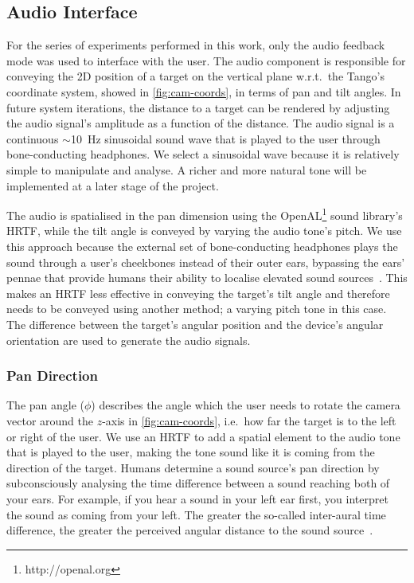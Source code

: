 \documentclass[sigconf, review=true, screen=true, anonymous=true]{acmart}
\begin{document}
\subsection{Audio Interface}

For the series of experiments performed in this work, only the audio feedback mode was used to interface with the user.
The audio component is responsible for conveying the 2D position of a target on the vertical plane w.r.t.\ the Tango's coordinate system, showed in \cref{fig:cam-coords}, in terms of pan and tilt angles.
In future system iterations, the distance to a target can be rendered by adjusting the audio signal's amplitude as a function of the distance.
The audio signal is a continuous $\sim$\SI{10}{\hertz} sinusoidal sound wave that is played to the user through bone-conducting headphones.
We select a sinusoidal wave because it is relatively simple to manipulate and analyse.
A richer and more natural tone will be implemented at a later stage of the project. 

The audio is spatialised in the pan dimension using the OpenAL\footnote{http://openal.org} sound library's HRTF, while the tilt angle is conveyed by varying the audio tone's pitch.
We use this approach because the external set of bone-conducting headphones plays the sound through a user's cheekbones instead of their outer ears, bypassing the ears' pennae that provide humans their ability to localise elevated sound sources~\cite{roffler1968factors, algazi2001elevation}.
This makes an HRTF less effective in conveying the target's tilt angle and therefore needs to be conveyed using another method; a varying pitch tone in this case.
The difference between the target's angular position and the device's angular orientation are used to generate the audio signals. 

\subsubsection{Pan Direction}

The pan angle ($\phi$) describes the angle which the user needs to rotate the camera vector around the $z$-axis in \cref{fig:cam-coords}, i.e.\ how far the target is to the left or right of the user.
We use an HRTF to add a spatial element to the audio tone that is played to the user, making the tone sound like it is coming from the direction of the target.
Humans determine a sound source's pan direction by subconsciously analysing the time difference between a sound reaching both of your ears.
For example, if you hear a sound in your left ear first, you interpret the sound as coming from your left.
The greater the so-called inter-aural time difference, the greater the perceived angular distance to the sound source~\cite{wightman1992dominant}.
\end{document}

